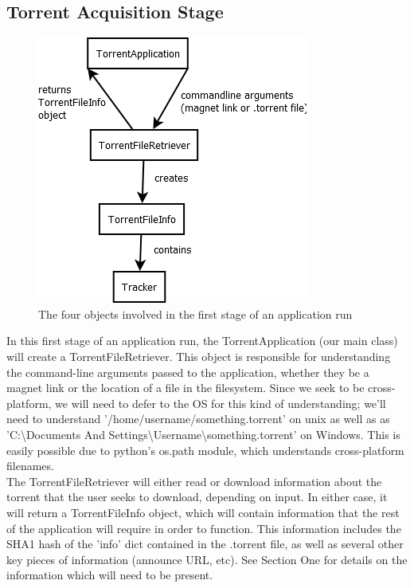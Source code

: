\documentclass[letter]{scrartcl}
\begin{document}
\subsection{Torrent Acquisition Stage}

\begin{figure}[h]
\centering
\includegraphics[scale=.5]{StepOne.png}
\caption{The four objects involved in the first stage of an application run}
\end{figure}

In this first stage of an application run, the TorrentApplication (our main class) will create a TorrentFileRetriever.  This object is responsible for understanding the command-line arguments passed to the application, whether they be a magnet link or the location of a file in the filesystem.  Since we seek to be cross-platform, we will need to defer to the OS for this kind of understanding; we'll need to understand '/home/username/something.torrent' on unix as well as as 'C:\textbackslash Documents And Settings\textbackslash Username\textbackslash something.torrent' on Windows.  This is easily possible due to python's os.path module, which understands cross-platform filenames.\\

The TorrentFileRetriever will either read or download information about the torrent that the user seeks to download, depending on input.  In either case, it will return a TorrentFileInfo object, which will contain information that the rest of the application will require in order to function.  This information includes the SHA1 hash of the 'info' dict contained in the .torrent file, as well as several other key pieces of information (announce URL, etc).  See Section One for details on the information which will need to be present.\\
\end{document}

